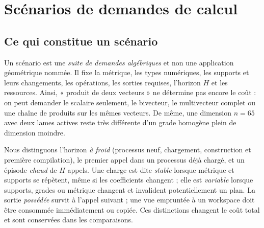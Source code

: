 \documentclass[11pt,a4paper]{article}
\begin{document}
\section{Scénarios de demandes de calcul}
\label{sec:scenarios}
\subsection{Ce qui constitue un scénario}
Un scénario est une \emph{suite de demandes algébriques} et non une
application géométrique nommée. Il fixe la métrique, les types numériques,
les supports et leurs changements, les opérations, les sorties requises,
l'horizon $H$ et les ressources. Ainsi, « produit de deux vecteurs » ne
détermine pas encore le coût : on peut demander le scalaire seulement,
le bivecteur, le multivecteur complet ou une chaîne de produits sur les
mêmes vecteurs. De même, une dimension $n=65$ avec deux lames actives
reste très différente d'un grade homogène plein de dimension moindre.

Nous distinguons l'horizon \emph{à froid} (processus neuf, chargement,
construction et première compilation), le premier appel dans un processus
déjà chargé, et un épisode \emph{chaud} de $H$ appels. Une charge est dite
\emph{stable} lorsque métrique et supports se répètent, même si les
coefficients changent ; elle est \emph{variable} lorsque supports, grades
ou métrique changent et invalident potentiellement un plan. La sortie
\emph{possédée} survit à l'appel suivant ; une vue empruntée à un workspace
doit être consommée immédiatement ou copiée. Ces distinctions changent le
coût total et sont conservées dans les comparaisons.
\end{document}
